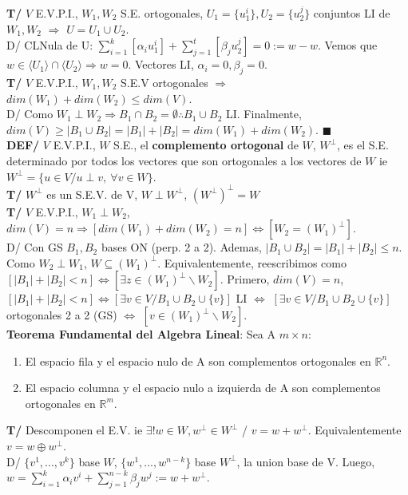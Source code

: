 \documentclass[10pt,a4paper]{article}
\newcommand*{\QEDA}{\null\nobreak\hfill\ensuremath{\blacksquare}}
\begin{document}
\textbf{T/} $V$ E.V.P.I., $W_1, W_2$ S.E. ortogonales, $U_1 = \{u_1^i\}, U_2 = \{u_2^j\}$ conjuntos LI de $W_1, W_2$ $\Rightarrow$ $U = U_1 \cup U_2$.\\
D/ CLNula de U: $\sum_{i=1}^k [\alpha_i u_1^i] + \sum_{j=1}^t[\beta_ju_2^j] = 0 := w - w$. Vemos que $w \in \langle U_1 \rangle \cap \langle U_2 \rangle \Rightarrow w = 0$. Vectores LI, $\alpha_i = 0, \beta_j = 0$.\\
\textbf{T/} $V$ E.V.P.I., $W_1, W_2$ S.E.V ortogonales $\Rightarrow$ $dim(W_1) + dim (W_2) \leq dim (V)$.\\
D/ Como $W_1 \perp W_2 \Rightarrow B_1 \cap B_2 = \emptyset \therefore B_1 \cup B_2$ LI. Finalmente, $dim(V) \geq |B_1 \cup B_2| = |B_1| + |B_2| = dim(W_1) + dim(W_2)$. \QEDA\\
\textbf{DEF/} $V$ E.V.P.I., $W$ S.E., el \textbf{complemento ortogonal} de $W$, $W^\perp$, es el S.E. determinado por todos los vectores que son ortogonales a los vectores de $W$ ie $W^\perp = \{u \in V / u \perp v,\ \forall v \in W\}$.\\
\textbf{T/} $W^\perp$ es un S.E.V. de V, $W \perp W^\perp$, $(W^\perp)^\perp = W$\\
\textbf{T/} $V$ E.V.P.I., $W_1 \perp W_2$, $dim(V)=n \Rightarrow [dim(W_1) + dim(W_2) = n] \iff [W_2 = (W_1)^\perp]$.\\
D/ Con GS $B_1, B_2$ bases ON (perp. 2 a 2). Ademas, $|B_1 \cup B_2| = |B_1| + |B_2| \leq n$. Como $W_2 \perp W_1$, $W \subseteq (W_1)^\perp$. Equivalentemente, reescribimos como $[|B_1| + |B_2| < n] \iff [\exists z \in (W_1)^\perp \backslash W_2]$. Primero, $dim(V) = n$, $[|B_1|+|B_2| < n] \iff [\exists v \in V / B_1 \cup B_2 \cup \{v\}]$ LI $\iff$ $[\exists v \in V / B_1 \cup B_2 \cup \{v\}]$ ortogonales 2 a 2 (GS) $\iff$ $[v \in (W_1)^\perp \backslash W_2]$.\\
\textbf{Teorema Fundamental del Algebra Lineal}: Sea A $m \times n$:
\begin{enumerate}
\item El espacio fila y el espacio nulo de A son complementos ortogonales en $\mathbb{R}^n$.
\item El espacio columna y el espacio nulo a izquierda de A son complementos ortogonales en $\mathbb{R}^m$.
\end{enumerate}
\textbf{T/} Descomponen el E.V. ie $\exists! w \in W, w^\perp \in W^\perp$ / $v = w + w^\perp$. Equivalentemente $v = w \oplus w^\perp$.\\
D/ $\{v^1,...,v^k\}$ base $W$, $\{w^1,...,w^{n-k}\}$ base $W^\perp$, la union base de V. Luego, $w = \sum_{i=1}^k \alpha_i v^i + \sum_{j=1}^{n-k} \beta_j w^j := w + w^\perp$.
\end{document}

